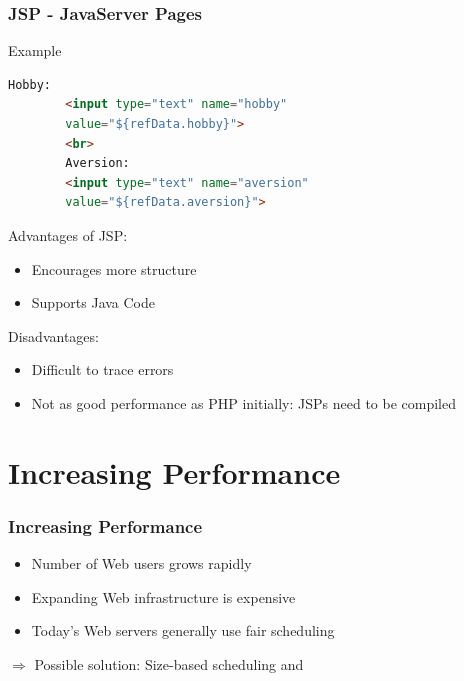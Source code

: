 \documentclass[9pt]{beamer}
\begin{document}
\begin{frame}[fragile]
\frametitle<presentation>{JSP - JavaServer Pages}
  \begin{exampleblock}{Example}
    \begin{lstlisting}[language=html, captionpos=b,caption={Java embedded in HTML. Taken from \cite{downey2008web}},label=lst:jsp]
        Hobby:
        <input type="text" name="hobby" 
        value="${refData.hobby}">
        <br>
        Aversion:
        <input type="text" name="aversion" 
        value="${refData.aversion}">
    \end{lstlisting}
  \end{exampleblock}

\end{frame}

\begin{frame}
  \begin{multicols}{2}
    Advantages of JSP:
    \begin{itemize}
    \item Encourages more structure
    \item Supports Java Code 
    \end{itemize}
    \vfill
    \columnbreak
    
    Disadvantages:
    \begin{itemize}
      \item Difficult to trace errors
      \item Not as good performance as PHP initially: JSPs need to be compiled
    \end{itemize}
  \end{multicols}
\end{frame}

\section{Increasing Performance}

\begin{frame}
\frametitle<presentation>{Increasing Performance}

  \begin{itemize}
    \item Number of Web users grows rapidly
    \item Expanding Web infrastructure is expensive
    \item Today's Web servers generally use fair scheduling 
  \end{itemize}
  $\Longrightarrow$ Possible solution: Size-based scheduling \cite{schroederSize} and \cite{schorederSchedule}

\end{frame}
\end{document}
